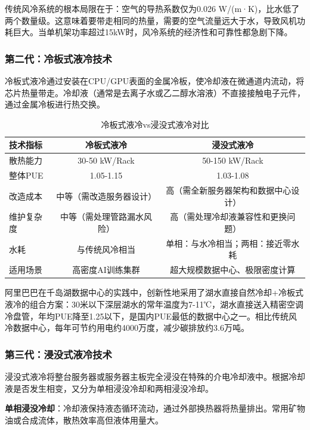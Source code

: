 传统风冷系统的根本局限在于：空气的导热系数仅为0.026 W/(m·K)，比水低了两个数量级。这意味着要带走相同的热量，需要的空气流量远大于水，导致风机功耗巨大。当单机架功率超过15kW时，风冷系统的经济性和可靠性都急剧下降。

\subsubsection{第二代：冷板式液冷技术}

冷板式液冷通过安装在CPU/GPU表面的金属冷板，使冷却液在微通道内流动，将芯片热量带走。冷却液（通常是去离子水或乙二醇水溶液）不直接接触电子元件，通过金属冷板进行热交换。

\begin{table}[htbp]
\centering
\caption{冷板式液冷vs浸没式液冷对比}
\begin{tabular}{lcc}
\toprule
\textbf{技术指标} & \textbf{冷板式液冷} & \textbf{浸没式液冷} \\
\midrule
散热能力 & 30-50 kW/Rack & 50-150 kW/Rack \\
整体PUE & 1.05-1.15 & 1.03-1.08 \\
改造成本 & 中等（需改造服务器设计） & 高（需全新服务器架构和数据中心设计） \\
维护复杂度 & 中等（需处理管路漏水风险） & 高（需处理冷却液兼容性和更换问题） \\
水耗 & 与传统风冷相当 & 单相：与水冷相当；两相：接近零水耗 \\
适用场景 & 高密度AI训练集群 & 超大规模数据中心、极限密度计算 \\
\bottomrule
\end{tabular}
\label{tab:liquid-cooling-comparison}
\end{table}

阿里巴巴在千岛湖数据中心的实践中，创新性地采用了湖水直接自然冷却+冷板式液冷的组合方案：30米以下深层湖水的常年温度为7-11℃，湖水直接送入精密空调冷盘管，年均PUE降至1.25以下，是国内PUE最低的数据中心之一。相比传统风冷数据中心，每年可节约用电约4000万度，减少碳排放约3.6万吨。

\subsubsection{第三代：浸没式液冷技术}

浸没式液冷将整台服务器或服务器主板完全浸没在特殊的介电冷却液中。根据冷却液是否发生相变，又分为单相浸没冷却和两相浸没冷却。

\textbf{单相浸没冷却}：冷却液保持液态循环流动，通过外部换热器将热量排出。常用矿物油或合成流体，散热效率高但液体用量大。

